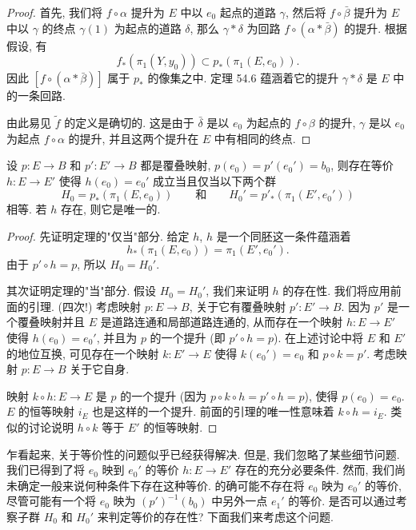 \begin{proof}
首先, 我们将 $f\circ\alpha$ 提升为 $E$ 中以 $e_{0}$ 起点的道路 $\gamma$, 然后将 $f\circ\bar{\beta}$ 提升为 $E$ 中以 $\gamma$ 的终点 $\gamma(1)$ 为起点的道路 $\delta$, 那么 $\gamma*\delta$ 为回路 $f\circ(\alpha*\bar{\beta})$ 的提升. 根据假设, 有
\[
f_{*}(\pi_{1}(Y,y_{0}))\subset p_{*}(\pi_{1}(E,e_{0})).
\]
因此 $[f\circ(\alpha*\bar{\beta})]$ 属于 $p_{*}$ 的像集之中. 定理 54.6 蕴涵着它的提升 $\gamma*\delta$ 是 $E$ 中的一条回路.

由此易见 $\widetilde{f}$ 的定义是确切的. 这是由于 $\bar{\delta}$ 是以 $e_{0}$ 为起点的 $f\circ\beta$ 的提升, $\gamma$ 是以 $e_{0}$ 为起点 $f\circ\alpha$ 的提升, 并且这两个提升在 $E$ 中有相同的终点.
\end{proof}

\begin{theorem}[以基点为映射的等价的存在唯一性]
\label{theorem:ch13-equivalence-same-subgroup}
设 $p\colon E\to B$ 和 $p'\colon E'\to B$ 都是覆叠映射, $p(e_{0})=p'(e_{0}')=b_{0}$, 则存在等价 $h\colon E\to E'$ 使得 $h(e_{0})=e_{0}'$ 成立当且仅当以下两个群
\[
H_{0}=p_{*}(\pi_{1}(E,e_{0}))\qquad\text{和}\qquad H_{0}'=p'_{*}(\pi_{1}(E',e_{0}'))
\]
相等. 若 $h$ 存在, 则它是唯一的.
\end{theorem}

\begin{proof}
先证明定理的"仅当"部分. 给定 $h$, $h$ 是一个同胚这一条件蕴涵着
\[
h_{*}(\pi_{1}(E,e_{0}))=\pi_{1}(E',e_{0}').
\]
由于 $p'\circ h=p$, 所以 $H_{0}=H_{0}'$.

其次证明定理的"当"部分. 假设 $H_{0}=H_{0}'$, 我们来证明 $h$ 的存在性. 我们将应用前面的引理. (四次!) 考虑映射 $p\colon E\to B$, 关于它有覆叠映射 $p'\colon E'\to B$. 因为 $p'$ 是一个覆叠映射并且 $E$ 是道路连通和局部道路连通的, 从而存在一个映射 $h\colon E\to E'$ 使得 $h(e_{0})=e_{0}'$, 并且为 $p$ 的一个提升 (即 $p'\circ h=p$). 在上述讨论中将 $E$ 和 $E'$ 的地位互换, 可见存在一个映射 $k\colon E'\to E$ 使得 $k(e_{0}')=e_{0}$ 和 $p\circ k=p'$. 考虑映射 $p\colon E\to B$ 关于它自身.

映射 $k\circ h\colon E\to E$ 是 $p$ 的一个提升 (因为 $p\circ k\circ h=p'\circ h=p$), 使得 $p(e_{0})=e_{0}$. $E$ 的恒等映射 $i_{E}$ 也是这样的一个提升. 前面的引理的唯一性意味着 $k\circ h=i_{E}$. 类似的讨论说明 $h\circ k$ 等于 $E'$ 的恒等映射.
\end{proof}

乍看起来, 关于等价性的问题似乎已经获得解决. 但是, 我们忽略了某些细节问题. 我们已得到了将 $e_{0}$ 映到 $e_{0}'$ 的等价 $h\colon E\to E'$ 存在的充分必要条件. 然而, 我们尚未确定一般来说何种条件下存在这种等价. 的确可能不存在将 $e_{0}$ 映为 $e_{0}'$ 的等价, 尽管可能有一个将 $e_{0}$ 映为 $(p')^{-1}(b_{0})$ 中另外一点 $e_{1}'$ 的等价. 是否可以通过考察子群 $H_{0}$ 和 $H_{0}'$ 来判定等价的存在性? 下面我们来考虑这个问题.

